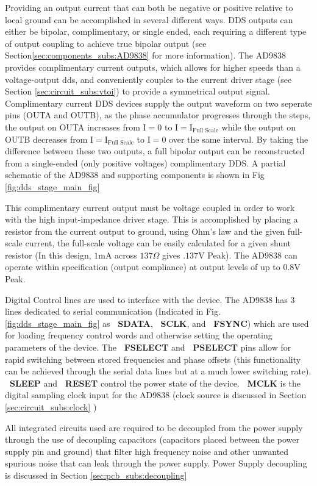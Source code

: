Providing an output current that can both be negative or positive relative to local ground can be accomplished in several different ways. DDS outputs can either be bipolar, complimentary, or single ended, each requiring a different type of output coupling to achieve true bipolar output (see Section\ref{sec:components_subs:AD9838} for more information). The AD9838 provides complimentary current outputs, which allows for higher speeds than a voltage-output dds, and conveniently couples to the current driver stage (see Section \ref{sec:circuit_subs:vtoi}) to provide a symmetrical output signal. Complimentary current DDS devices supply the output waveform on two seperate pins (OUTA and OUTB), as the phase accumulator progresses through the steps, the output on OUTA increases from I$=0$ to $\text{I} = \text{I}_\text{Full Scale}$ while the output on OUTB decreases from $\text{I} = \text{I}_\text{Full Scale}$ to $\text{I} = 0$ over the same interval. By taking the difference between these two outputs, a full bipolar output can be reconstructed from a single-ended (only positive voltages) complimentary DDS. A partial schematic of the AD9838 and supporting components is shown in Fig \ref{fig:dds_stage_main_fig}

This complimentary current output must be voltage coupled in order to work with the high input-impedance driver stage. This is accomplished by placing a resistor from the current output to ground, using Ohm's law and the given full-scale current, the full-scale voltage can be easily calculated for a given shunt resistor (In this design, $1\text{mA}$ across $137\Omega$ gives $.137\text{V}$ Peak). The AD9838 can operate within specification (output compliance) at output levels of up to $0.8\text{V}$ Peak.

Digital Control lines are used to interface with the device. The AD9838 has 3 lines dedicated to serial communication (Indicated in Fig. \ref{fig:dds_stage_main_fig} as {\bf~SDATA}, {\bf~SCLK}, and {\bf~FSYNC}) which are used for loading frequency control words and otherwise setting the operating parameters of the device. The {\bf~FSELECT} and {\bf~PSELECT} pins allow for rapid switching between stored frequencies and phase offsets (this functionality can be achieved through the serial data lines but at a much lower switching rate). {\bf~SLEEP} and {\bf~RESET} control the power state of the device. {\bf~MCLK} is the digital sampling clock input for the AD9838 (clock source is discussed in Section \ref{sec:circuit_subs:clock} )

All integrated circuits used are required to be decoupled from the power supply through the use of decoupling capacitors (capacitors placed between the power supply pin and ground) that filter high frequency noise and other unwanted spurious noise that can leak through the power supply. Power Supply decoupling is discussed in Section \ref{sec:pcb_subs:decoupling}



